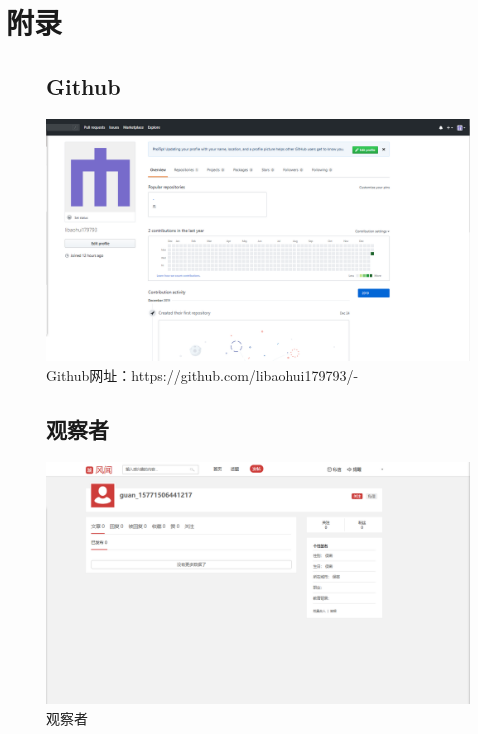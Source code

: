 \documentclass{article}
\begin{document}
\par


\section{附录}
\begin{itemize}

\begin{figure}[htb!]
\item\subsection{Github}
\centering
\includegraphics[scale=0.4]{Github}
\caption{Github网址：https://github.com/libaohui179793/-}
\label{fig:Github}
\end{figure}

\begin{figure}[htb!]
\item\subsection{观察者}
\centering
\includegraphics[scale=0.35]{guanchazhe}
\caption{观察者}
\label{fig:guanchazhe}
\end{figure}


\end{itemize}
\end{document}
